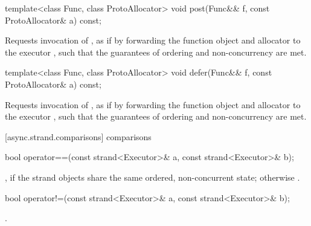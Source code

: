 %
\begin{itemdecl}
template<class Func, class ProtoAllocator>
  void post(Func&& f, const ProtoAllocator& a) const;
\end{itemdecl}

\begin{itemdescr}
\pnum
\effects Requests invocation of , as if by forwarding the function object  and allocator  to the executor , such that the guarantees of ordering and non-concurrency are met.
\end{itemdescr}

%
\begin{itemdecl}
template<class Func, class ProtoAllocator>
  void defer(Func&& f, const ProtoAllocator& a) const;
\end{itemdecl}

\begin{itemdescr}
\pnum
\effects Requests invocation of , as if by forwarding the function object  and allocator  to the executor , such that the guarantees of ordering and non-concurrency are met.
\end{itemdescr}



[async.strand.comparisons]{ comparisons}

%
\begin{itemdecl}
bool operator==(const strand<Executor>& a, const strand<Executor>& b);
\end{itemdecl}

\begin{itemdescr}
\pnum
\returns {}, if the strand objects share the same ordered, non-concurrent state; otherwise .
\end{itemdescr}

\begin{removedblock}
%
\begin{itemdecl}
bool operator!=(const strand<Executor>& a, const strand<Executor>& b);
\end{itemdecl}

\begin{itemdescr}
\pnum
\returns {}.
\end{itemdescr}
\end{removedblock}



